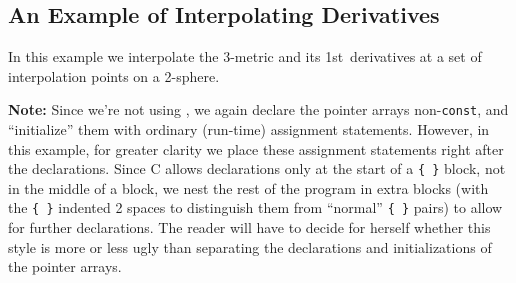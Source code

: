 
\subsection{An Example of Interpolating Derivatives}
\label{AEIThorns/AEILocalInterp/sect-example-derivatives}

In this example we interpolate the 3-metric and its 1st~derivatives
at a set of interpolation points on a 2-sphere.

{\bf Note:}
Since we're not using \Cplusplus, we again declare the pointer arrays
non-\verb|const|, and ``initialize'' them with ordinary (run-time)
assignment statements.  However, in this example, for greater clarity
we place these assignment statements right after the declarations.
Since C allows declarations only at the start of a \verb|{ }| block,
not in the middle of a block, we nest the rest of the program in extra
blocks (with the \verb|{ }| indented 2 spaces to distinguish them from
``normal'' \verb|{ }| pairs) to allow for further declarations.  The
reader will have to decide for herself whether this style is more or
less ugly than separating the declarations and initializations of the
pointer arrays.

